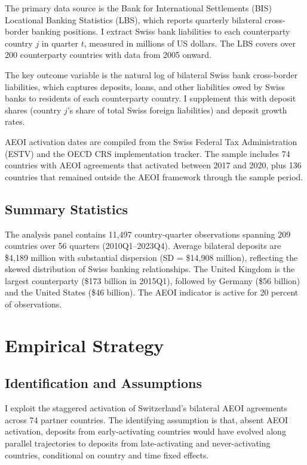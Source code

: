 \documentclass[12pt]{article}
\begin{document}
The primary data source is the Bank for International Settlements (BIS) Locational Banking Statistics (LBS), which reports quarterly bilateral cross-border banking positions. I extract Swiss bank liabilities to each counterparty country $j$ in quarter $t$, measured in millions of US dollars. The LBS covers over 200 counterparty countries with data from 2005 onward.

The key outcome variable is the natural log of bilateral Swiss bank cross-border liabilities, which captures deposits, loans, and other liabilities owed by Swiss banks to residents of each counterparty country. I supplement this with deposit shares (country $j$'s share of total Swiss foreign liabilities) and deposit growth rates.

AEOI activation dates are compiled from the Swiss Federal Tax Administration (ESTV) and the OECD CRS implementation tracker. The sample includes 74 countries with AEOI agreements that activated between 2017 and 2020, plus 136 countries that remained outside the AEOI framework through the sample period.

\subsection{Summary Statistics}



The analysis panel contains 11,497 country-quarter observations spanning 209 countries over 56 quarters (2010Q1--2023Q4). Average bilateral deposits are \$4,189 million with substantial dispersion (SD = \$14,908 million), reflecting the skewed distribution of Swiss banking relationships. The United Kingdom is the largest counterparty (\$173 billion in 2015Q1), followed by Germany (\$56 billion) and the United States (\$46 billion). The AEOI indicator is active for 20 percent of observations.

\section{Empirical Strategy}

\subsection{Identification and Assumptions}

I exploit the staggered activation of Switzerland's bilateral AEOI agreements across 74 partner countries. The identifying assumption is that, absent AEOI activation, deposits from early-activating countries would have evolved along parallel trajectories to deposits from late-activating and never-activating countries, conditional on country and time fixed effects.
\end{document}
